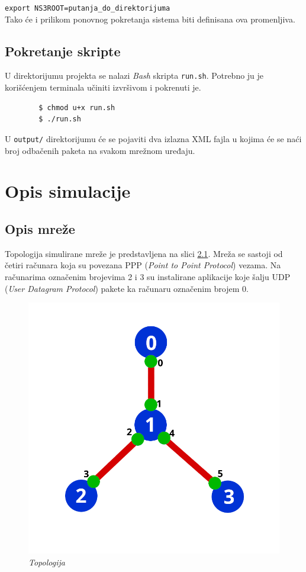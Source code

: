 \documentclass[a4paper, 12pt, projekat]{etf}
\begin{document}
	\verb|export NS3ROOT=putanja_do_direktorijuma|\\
	
	Tako će i prilikom ponovnog pokretanja sistema biti definisana ova promenljiva.
	
	\section{Pokretanje skripte}
	U direktorijumu projekta se nalazi \emph{Bash} skripta \verb|run.sh|. Potrebno ju je korišćenjem terminala učiniti izvršivom i pokrenuti je.
	\begin{verbatim}
		$ chmod u+x run.sh
		$ ./run.sh
	\end{verbatim}
	U \verb|output/| direktorijumu će se pojaviti dva izlazna XML fajla u kojima će se naći broj odbačenih paketa na svakom mrežnom uređaju.
	
	\chapter{Opis simulacije}
	\section{Opis mreže}
	Topologija simulirane mreže je predstavljena na slici \ref{fig:topologija}. Mreža se sastoji od četiri računara koja su povezana PPP (\emph{Point to Point Protocol}) vezama. Na računarima označenim brojevima 2 i 3 su instalirane aplikacije koje šalju UDP (\emph{User Datagram Protocol}) pakete ka računaru označenim brojem 0. 
	\begin{figure}[htb]
		\centering
		\includegraphics[width=.6\textwidth]{../slike/topologija.png}
		\caption{\emph{Topologija}}
		\label{fig:topologija}
	\end{figure}
	
\end{document}
